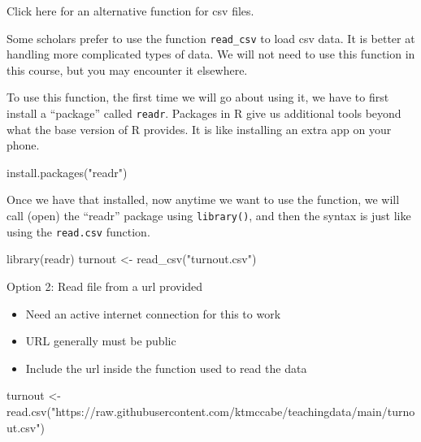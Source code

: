 \documentclass[
  letterpaper,
  DIV=11,
  numbers=noendperiod]{scrreprt}
\newenvironment{Shaded}{\begin{snugshade}}{\end{snugshade}}
\newcommand{\FunctionTok}[1]{\textcolor[rgb]{0.28,0.35,0.67}{#1}}
\newcommand{\NormalTok}[1]{\textcolor[rgb]{0.00,0.23,0.31}{#1}}
\newcommand{\OtherTok}[1]{\textcolor[rgb]{0.00,0.23,0.31}{#1}}
\newcommand{\StringTok}[1]{\textcolor[rgb]{0.13,0.47,0.30}{#1}}
\providecommand{\tightlist}{%
  \setlength{\itemsep}{0pt}\setlength{\parskip}{0pt}}\usepackage{longtable,booktabs,array}
\begin{document}
Click here for an alternative function for csv files.

Some scholars prefer to use the function \texttt{read\_csv} to load csv
data. It is better at handling more complicated types of data. We will
not need to use this function in this course, but you may encounter it
elsewhere.

To use this function, the first time we will go about using it, we have
to first install a ``package'' called \texttt{readr}. Packages in R give
us additional tools beyond what the base version of R provides. It is
like installing an extra app on your phone.

\begin{Shaded}
\begin{Highlighting}[]
\FunctionTok{install.packages}\NormalTok{(}\StringTok{"readr"}\NormalTok{)}
\end{Highlighting}
\end{Shaded}

Once we have that installed, now anytime we want to use the function, we
will call (open) the ``readr'' package using \texttt{library()}, and
then the syntax is just like using the \texttt{read.csv} function.

\begin{Shaded}
\begin{Highlighting}[]
\FunctionTok{library}\NormalTok{(readr)}
\NormalTok{turnout }\OtherTok{\textless{}{-}} \FunctionTok{read\_csv}\NormalTok{(}\StringTok{"turnout.csv"}\NormalTok{)}
\end{Highlighting}
\end{Shaded}

Option 2: Read file from a url provided

\begin{itemize}
\tightlist
\item
  Need an active internet connection for this to work
\item
  URL generally must be public
\item
  Include the url inside the function used to read the data
\end{itemize}

\begin{Shaded}
\begin{Highlighting}[]
\NormalTok{turnout }\OtherTok{\textless{}{-}} \FunctionTok{read.csv}\NormalTok{(}\StringTok{"https://raw.githubusercontent.com/ktmccabe/teachingdata/main/turnout.csv"}\NormalTok{)}
\end{Highlighting}
\end{Shaded}
\end{document}
